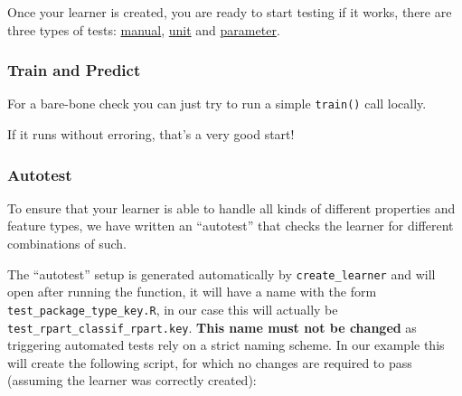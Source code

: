 \documentclass[
]{scrbook}
\newenvironment{Shaded}{\begin{snugshade}}{\end{snugshade}}
\newcommand{\CommentTok}[1]{\textcolor[rgb]{0.56,0.35,0.01}{\textit{#1}}}
\newcommand{\FunctionTok}[1]{\textcolor[rgb]{0.00,0.00,0.00}{#1}}
\newcommand{\NormalTok}[1]{#1}
\newcommand{\OtherTok}[1]{\textcolor[rgb]{0.56,0.35,0.01}{#1}}
\newcommand{\SpecialCharTok}[1]{\textcolor[rgb]{0.00,0.00,0.00}{#1}}
\newcommand{\StringTok}[1]{\textcolor[rgb]{0.31,0.60,0.02}{#1}}
\renewenvironment{Shaded} {\begin{snugshade}\small} {\end{snugshade}}
\begin{document}
Once your learner is created, you are ready to start testing if it works, there are three types of tests: \protect\hyperlink{learner-test-manual}{manual}, \protect\hyperlink{learner-test-unit}{unit} and \protect\hyperlink{learner-test-parameter}{parameter}.

\hypertarget{learner-test-manual}{%
\subsubsection{Train and Predict}\label{learner-test-manual}}

For a bare-bone check you can just try to run a simple \texttt{train()} call locally.

\begin{Shaded}
\end{Shaded}

If it runs without erroring, that's a very good start!

\hypertarget{learner-test-unit}{%
\subsubsection{Autotest}\label{learner-test-unit}}

To ensure that your learner is able to handle all kinds of different properties and feature types, we have written an ``autotest'' that checks the learner for different combinations of such.

The ``autotest'' setup is generated automatically by \texttt{create\_learner} and will open after running the function, it will have a name with the form \texttt{test\_package\_type\_key.R}, in our case this will actually be \texttt{test\_rpart\_classif\_rpart.key}. \textbf{This name must not be changed} as triggering automated tests rely on a strict naming scheme. In our example this will create the following script, for which no changes are required to pass (assuming the learner was correctly created):
\end{document}
